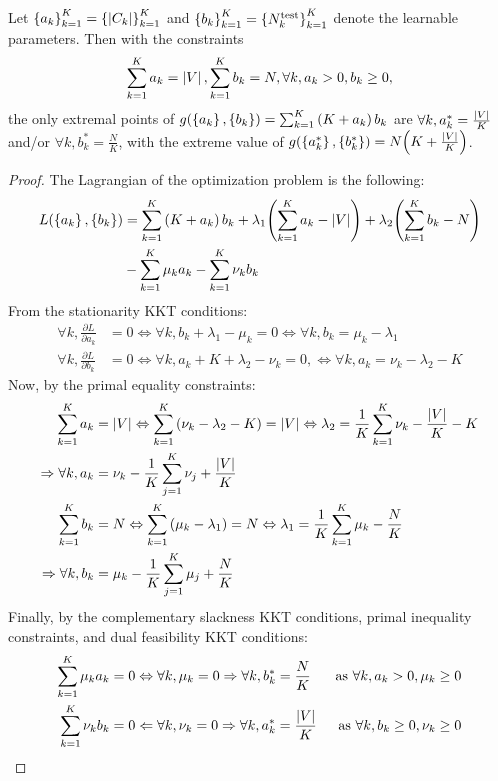 \begin{lemma}
    \label{lemma:kkt_evaluation_cost}
    Let $\mathopen{}\left\{a_k\right\}_{k=1}^{K}=\mathopen{}\left\{\mathopen{}\left|C_k\right|\right\}_{k=1}^{K}$ and $\mathopen{}\left\{b_k\right\}_{k=1}^{K}=\mathopen{}\left\{N_k^{\text{test}}\right\}_{k=1}^{K}$ denote the learnable parameters. Then with the constraints $$\sum_{k=1}^{K}{a_k}=\mathopen{}\left|V\right|, \sum_{k=1}^{K}{b_k}=N, \forall k, a_k > 0, b_k \geq 0,$$ the only extremal points of $g\mathopen{}\left(\mathopen{}\left\{a_k\right\},\mathopen{}\left\{b_k\right\}\right)=\sum_{k=1}^{K}{\mathopen{}\left(K + a_k\right)b_k}$ are $\forall k, a^*_k = \frac{\mathopen{}\left|V\right|}{K}$ and/or $\forall k, b^*_k = \frac{N}{K}$, with the extreme value of $g\mathopen{}\left(\mathopen{}\left\{a^*_k\right\},\mathopen{}\left\{b^*_k\right\}\right)=N\mathopen{}\left(K + \frac{\mathopen{}\left|V\right|}{K}\right)$.
\end{lemma}
    \begin{proof}
        The Lagrangian of the optimization problem is the following:
        \begin{align*}
             L\mathopen{}\left(\mathopen{}\left\{a_k\right\},\mathopen{}\left\{b_k\right\}\right) &= \sum_{k=1}^{K}{\mathopen{}\left(K + a_k\right)b_k} + \lambda_1 \mathopen{}\left(\sum_{k=1}^{K}{a_k} - \mathopen{}\left|V\right|\right) + \lambda_2 \mathopen{}\left(\sum_{k=1}^{K}{b_k} - N\right) \\
             &- \sum_{k=1}^{K}{\mu_k a_k} - \sum_{k=1}^{K}{\nu_k b_k}
        \end{align*}
        $$$$
    From the stationarity KKT conditions:
    \begin{align*}
        \forall k, \frac{\partial L}{\partial a_k} &= 0 \Leftrightarrow \forall k, b_k + \lambda_1 - \mu_k = 0 \Leftrightarrow  \forall k, b_k = \mu_k - \lambda_1 \\
        \forall k, \frac{\partial L}{\partial b_k} &= 0 \Leftrightarrow \forall k, a_k + K + \lambda_2 - \nu_k = 0, \Leftrightarrow \forall k, a_k = \nu_k - \lambda_2 - K
    \end{align*}
    Now, by the primal equality constraints:
    \begin{align*}
        \sum_{k=1}^{K}{a_k} &= \mathopen{}\left|V\right| \Leftrightarrow \sum_{k=1}^{K}{\mathopen{}\left(\nu_k - \lambda_2 - K\right)} = \mathopen{}\left|V\right| \Leftrightarrow \lambda_2 = \frac{1}{K} \sum_{k=1}^{K}{\nu_k} - \frac{\mathopen{}\left|V\right|}{K} - K \\
        \Rightarrow \forall k, a_k &= \nu_k - \frac{1}{K} \sum_{j=1}^{K}{\nu_j} + \frac{\mathopen{}\left|V\right|}{K} \\
        \sum_{k=1}^{K}{b_k} &= N \Leftrightarrow \sum_{k=1}^{K}{\mathopen{}\left(\mu_k - \lambda_1\right)} = N \Leftrightarrow \lambda_1 = \frac{1}{K} \sum_{k=1}^{K}{\mu_k} - \frac{N}{K} \\
        \Rightarrow \forall k, b_k &= \mu_k - \frac{1}{K} \sum_{j=1}^{K}{\mu_j} + \frac{N}{K}
    \end{align*}
    Finally, by the complementary slackness KKT conditions, primal inequality constraints, and dual feasibility KKT conditions:
    \begin{align*}
        \sum_{k=1}^{K}{\mu_k a_k} &= 0 \Leftrightarrow \forall k, \mu_k = 0 \Rightarrow \forall k, b^*_k=\frac{N}{K} & \text{ as $\forall k, a_k>0,\mu_k \geq 0$}\\
        \sum_{k=1}^{K}{\nu_k b_k} &= 0 \Leftarrow \forall k, \nu_k = 0 \Rightarrow \forall k, a^*_k = \frac{\mathopen{}\left|V\right|}{K} & \text{ as $\forall k, b_k \geq 0,\nu_k \geq 0$}
    \end{align*}
    \end{proof}

